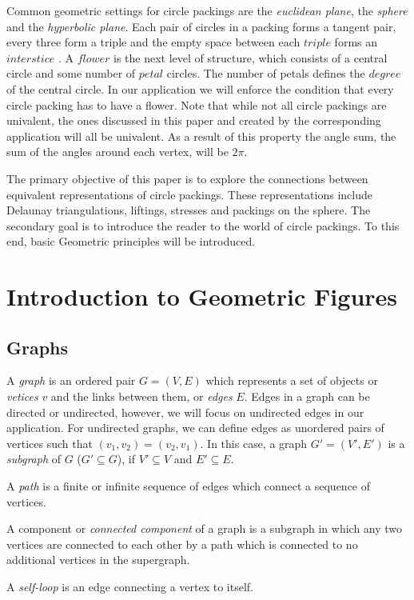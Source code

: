 \documentclass[11pt]{article}
\begin{document}
Common geometric settings for circle packings are the \emph{euclidean plane}, the \emph{sphere} and the \emph{hyperbolic plane}. Each pair of circles in a packing forms a tangent pair, every three form a triple and the empty space between each $triple$ forms an $interstice$ \cite{stephenson05introduction}. A $flower$ is the next level of structure, which consists of a central circle and some number of $petal$ circles. The number of petals defines the $degree$ of the central circle. In our application we will enforce the condition that every circle packing has to have a flower. Note that while not all circle packings are univalent, the ones discussed in this paper and created by the corresponding application will all be univalent. As a result of this property the angle sum, the sum of the angles around each vertex, will be $2\pi$.

The primary objective of this paper is to explore the connections between equivalent representations of circle packings. These representations include Delaunay triangulations, liftings, stresses and packings on the sphere. The secondary goal is to introduce the reader to the world of circle packings. To this end, basic Geometric principles will be introduced.

\section{Introduction to Geometric Figures}
\subsection{Graphs}
A \emph{graph} is an ordered pair $G=(V,E)$ which represents a set of objects or \emph{vetices} $v$ and the links between them, or \emph{edges} $E$. Edges in a graph can be directed or undirected, however, we will focus on undirected edges in our application. For undirected graphs, we can define edges as unordered pairs of vertices such that $(v_1, v_2) = (v_2, v_1)$. In this case, a graph $G' = (V',E')$ is a \emph{subgraph} of $G$ ($G' \subseteq G$), if $V' \subseteq V$ and $E' \subseteq E$.

A \emph{path} is a finite or infinite sequence of edges which connect a sequence of vertices.

  A component or \emph{connected component} of a graph is a subgraph in which any two vertices are connected to each other by a path which is connected to no additional vertices in the supergraph.

  A \emph{self-loop} is an edge connecting a vertex to itself.
  
\end{document}
